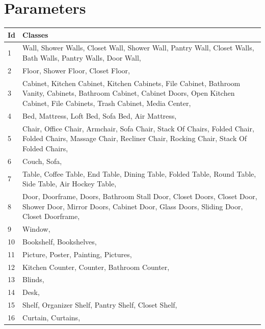     \chapter{Parameters}
        \begin{table}[h]
    	\begin{center}
    		\begin{tabular}{ | l | p{17cm} |}
    			\hline
    			
    			\cellcolor{purple!30}Id & \cellcolor{purple!30}Classes \\ \hline
    			
    			1 & Wall, Shower Walls, Closet Wall, Shower Wall, Pantry Wall, Closet Walls, Bath Walls, Pantry Walls, Door Wall, \\ \hline
    			2 & Floor, Shower Floor, Closet Floor, \\ \hline
    			3 & Cabinet, Kitchen Cabinet, Kitchen Cabinets, File Cabinet, Bathroom Vanity, Cabinets, Bathroom Cabinet, Cabinet Doors, Open Kitchen Cabinet, File Cabinets, Trash Cabinet, Media Center, \\ \hline
    			4 & Bed, Mattress, Loft Bed, Sofa Bed, Air Mattress, \\ \hline
    			5 & Chair, Office Chair, Armchair, Sofa Chair, Stack Of Chairs, Folded Chair, Folded Chairs, Massage Chair, Recliner Chair, Rocking Chair, Stack Of Folded Chairs, \\ \hline
    			6 & Couch, Sofa, \\ \hline
    			7 & Table, Coffee Table, End Table, Dining Table, Folded Table, Round Table, Side Table, Air Hockey Table, \\ \hline
    			8 & Door, Doorframe, Doors, Bathroom Stall Door, Closet Doors, Closet Door, Shower Door, Mirror Doors, Cabinet Door, Glass Doors, Sliding Door, Closet Doorframe, \\ \hline
    			9 & Window, \\ \hline
    			10 & Bookshelf, Bookshelves, \\ \hline
    			11 & Picture, Poster, Painting, Pictures, \\ \hline
    			12 & Kitchen Counter, Counter, Bathroom Counter, \\ \hline
    			13 & Blinds, \\ \hline
    			14 & Desk, \\ \hline
    			15 & Shelf, Organizer Shelf, Pantry Shelf, Closet Shelf, \\ \hline
    			16 & Curtain, Curtains, \\ \hline

\end{tabular}
\end{center}
\end{table}
